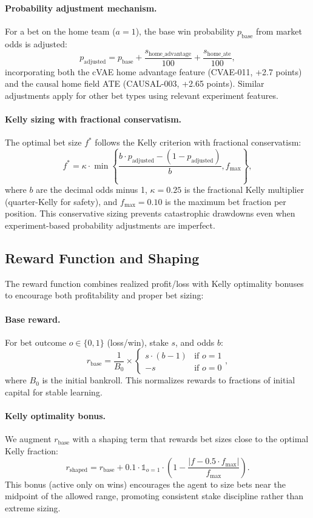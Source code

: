 \paragraph{Probability adjustment mechanism.}
For a bet on the home team ($a=1$), the base win probability $p_{\text{base}}$ from market odds is adjusted:
\[
p_{\text{adjusted}} = p_{\text{base}} + \frac{s_{\text{home\_advantage}}}{100} + \frac{s_{\text{home\_ate}}}{100},
\]
incorporating both the cVAE home advantage feature (CVAE-011, +2.7 points) and the causal home field ATE (CAUSAL-003, +2.65 points). Similar adjustments apply for other bet types using relevant experiment features.

\paragraph{Kelly sizing with fractional conservatism.}
The optimal bet size $f^*$ follows the Kelly criterion with fractional conservatism:
\[
f^* = \kappa \cdot \min\left\{ \frac{b \cdot p_{\text{adjusted}} - (1 - p_{\text{adjusted}})}{b}, f_{\max} \right\},
\]
where $b$ are the decimal odds minus 1, $\kappa=0.25$ is the fractional Kelly multiplier (quarter-Kelly for safety), and $f_{\max}=0.10$ is the maximum bet fraction per position. This conservative sizing prevents catastrophic drawdowns even when experiment-based probability adjustments are imperfect.

\subsection{Reward Function and Shaping}

The reward function combines realized profit/loss with Kelly optimality bonuses to encourage both profitability and proper bet sizing:

\paragraph{Base reward.}
For bet outcome $o \in \{0, 1\}$ (loss/win), stake $s$, and odds $b$:
\[
r_{\text{base}} = \frac{1}{B_0} \times \begin{cases}
s \cdot (b - 1) & \text{if } o = 1 \\
-s & \text{if } o = 0
\end{cases},
\]
where $B_0$ is the initial bankroll. This normalizes rewards to fractions of initial capital for stable learning.

\paragraph{Kelly optimality bonus.}
We augment $r_{\text{base}}$ with a shaping term that rewards bet sizes close to the optimal Kelly fraction:
\[
r_{\text{shaped}} = r_{\text{base}} + 0.1 \cdot \mathbb{1}_{o=1} \cdot \left(1 - \frac{|f - 0.5 \cdot f_{\max}|}{f_{\max}}\right).
\]
This bonus (active only on wins) encourages the agent to size bets near the midpoint of the allowed range, promoting consistent stake discipline rather than extreme sizing.

